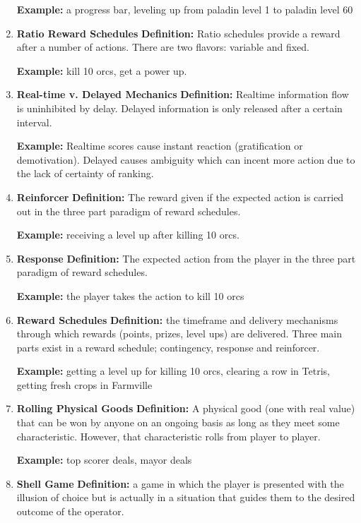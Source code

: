 \begin{enumerate}
\textbf{Example:} a progress bar, leveling up from paladin level 1 to paladin level 60

\item \textbf{Ratio Reward Schedules}
\textbf{Definition:} Ratio schedules provide a reward after a number of actions. There are two flavors: variable and fixed.

\textbf{Example:} kill 10 orcs, get a power up.

\item \textbf{Real-time v. Delayed Mechanics}
\textbf{Definition:} Realtime information flow is uninhibited by delay. Delayed information is only released after a certain interval.

\textbf{Example:} Realtime scores cause instant reaction (gratification or demotivation). Delayed causes ambiguity which can incent more action due to the lack of certainty of ranking.

\item \textbf{Reinforcer}
\textbf{Definition:} The reward given if the expected action is carried out in the three part paradigm of reward schedules.

\textbf{Example:} receiving a level up after killing 10 orcs.

\item \textbf{Response}
\textbf{Definition:} The expected action from the player in the three part paradigm of reward schedules.

\textbf{Example:} the player takes the action to kill 10 orcs

\item \textbf{Reward Schedules}
\textbf{Definition:} the timeframe and delivery mechanisms through which rewards (points, prizes, level ups) are delivered. Three main parts exist in a reward schedule; contingency, response and reinforcer.

\textbf{Example:} getting a level up for killing 10 orcs, clearing a row in Tetris, getting fresh crops in Farmville

\item \textbf{Rolling Physical Goods}
\textbf{Definition:} A physical good (one with real value) that can be won by anyone on an ongoing basis as long as they meet some characteristic. However, that characteristic rolls from player to player.

\textbf{Example:} top scorer deals, mayor deals

\item \textbf{Shell Game}
\textbf{Definition:} a game in which the player is presented with the illusion of choice but is actually in a situation that guides them to the desired outcome of the operator.


\end{enumerate}
